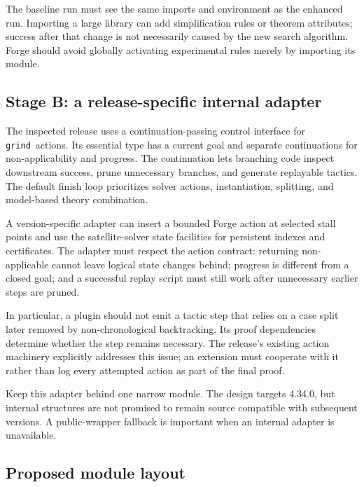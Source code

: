 \documentclass[11pt,a4paper]{article}
\newcommand{\grind}{\texttt{grind}}
\begin{document}
The baseline run must see the same imports and environment as the enhanced run. Importing a large library can add simplification rules or theorem attributes; success after that change is not necessarily caused by the new search algorithm. Forge should avoid globally activating experimental rules merely by importing its module.

\subsection{Stage B: a release-specific internal adapter}

The inspected release uses a continuation-passing control interface for \grind\ actions. Its essential type has a current goal and separate continuations for non-applicability and progress. The continuation lets branching code inspect downstream success, prune unnecessary branches, and generate replayable tactics. The default finish loop prioritizes solver actions, instantiation, splitting, and model-based theory combination.\cite{grind-action,grind-finish}

A version-specific adapter can insert a bounded Forge action at selected stall points and use the satellite-solver state facilities for persistent indexes and certificates. The adapter must respect the action contract: returning non-applicable cannot leave logical state changes behind; progress is different from a closed goal; and a successful replay script must still work after unnecessary earlier steps are pruned.

In particular, a plugin should not emit a tactic step that relies on a case split later removed by non-chronological backtracking. Its proof dependencies determine whether the step remains necessary. The release's existing action machinery explicitly addresses this issue; an extension must cooperate with it rather than log every attempted action as part of the final proof.\cite{grind-action}

Keep this adapter behind one narrow module. The design targets 4.34.0, but internal structures are not promised to remain source compatible with subsequent versions. A public-wrapper fallback is important when an internal adapter is unavailable.

\subsection{Proposed module layout}
\end{document}
